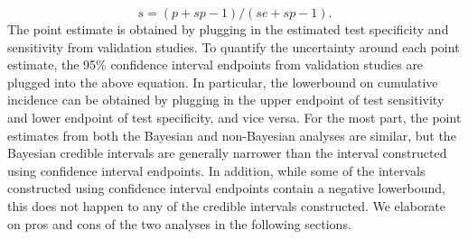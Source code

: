 \[
s = (p + sp - 1) / (se + sp - 1).
\]
The point estimate is obtained by plugging in the estimated test specificity and sensitivity from validation studies. To quantify the uncertainty around each point estimate, the 95\% confidence interval endpoints from validation studies are plugged into the above equation. In particular, the lowerbound on cumulative incidence can be obtained by plugging in the upper endpoint of test sensitivity and lower endpoint of test specificity, and vice versa. For the most part, the point estimates from both the Bayesian and non-Bayesian analyses are similar, but the Bayesian credible intervals are generally narrower than the interval constructed using confidence interval endpoints. In addition, while some of the intervals constructed using confidence interval endpoints contain a negative lowerbound, this does not happen to any of the credible intervals constructed. We elaborate on pros and cons of the two analyses in the following sections.